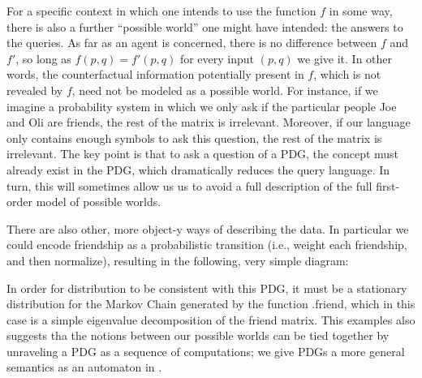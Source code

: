 \documentclass{article}
\theoremstyle{definition}
\theoremstyle{remark}
\newcommand{\var}[1]{\mathsf{#1}}
\begin{document}
\begin{example}
    For a specific context in which one intends to use the function $f$ in some way, there is also a further ``possible world'' one might have intended: the answers to the queries. As far as an agent is concerned, there is no difference between $f$ and $f'$, so long as $f(p,q) = f'(p,q)$ for every input $(p,q)$ we give it. In other words, the counterfactual information potentially present in $f$, which is not revealed by $f$, need not be modeled as a possible world. For instance, if we imagine a probability system in which we only ask if the particular people Joe and Oli are friends, the rest of the matrix is irrelevant.     
    Moreover, if our language only contains enough symbols to ask this question, the rest of the matrix is irrelevant. 
    The key point is that to ask a question of a PDG, the concept must already exist in the PDG, which dramatically reduces the query language. In turn, this will sometimes allow us us to avoid a full description of the full first-order model of possible worlds. 

    There are also other, more object-y ways of describing the data. In particular we could encode friendship as a probabilistic transition (i.e., weight each friendship, and then normalize), resulting in the following, very simple diagram:
    \begin{center}
        \hspace{1cm}
    \end{center}
    In order for distribution to be consistent with this PDG, it must be a stationary distribution for the Markov Chain generated by the function .friend, which in this case is a simple eigenvalue decomposition of the friend matrix. This examples also suggests tha the notions between our possible worlds can be tied together by unraveling a PDG as a sequence of computations; we give PDGs a more general semantics as an automaton in .
\end{example}
\end{document}
